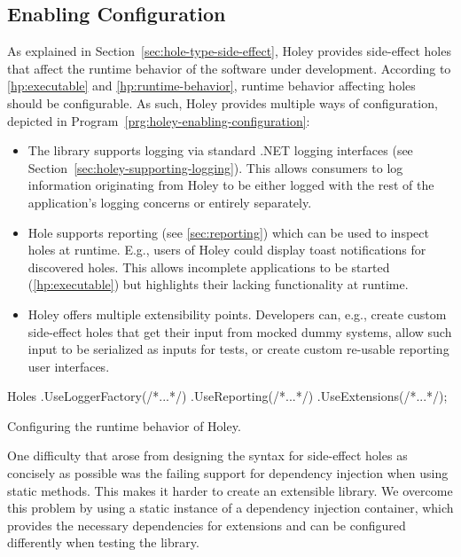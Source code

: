 \subsection{Enabling Configuration}
\label{sec:holey-enabling-configuration}
As explained in Section~\ref{sec:hole-type-side-effect}, Holey provides side-effect holes that affect the runtime behavior of the software under development.
According to \ref{hp:executable} and \ref{hp:runtime-behavior}, runtime behavior affecting holes should be configurable.
As such, Holey provides multiple ways of configuration, depicted in Program~\ref{prg:holey-enabling-configuration}:
\begin{itemize}
    \item The library supports logging via standard .NET logging interfaces (see Section~\ref{sec:holey-supporting-logging}). This allows consumers to log information originating from Holey to be either logged with the rest of the application's logging concerns or entirely separately.
    \item Hole supports reporting (see \ref{sec:reporting}) which can be used to inspect holes at runtime. E.g., users of Holey could display toast notifications for discovered holes. This allows incomplete applications to be started (\ref{hp:executable}) but highlights their lacking functionality at runtime.
    \item Holey offers multiple extensibility points. Developers can, e.g., create custom side-effect holes that get their input from mocked dummy systems, allow such input to be serialized as inputs for tests, or create custom re-usable reporting user interfaces.
\end{itemize}

\begin{program}[ht]
\begin{CsCode}
Holes
	.UseLoggerFactory(/*...*/)
	.UseReporting(/*...*/)
	.UseExtensions(/*...*/);
\end{CsCode}
\caption{Configuring the runtime behavior of Holey.}
\label{prg:holey-enabling-configuration}
\end{program}

One difficulty that arose from designing the syntax for side-effect holes as concisely as possible was the failing support for dependency injection when using static methods.
This makes it harder to create an extensible library.
We overcome this problem by using a static instance of a dependency injection container, which provides the necessary dependencies for extensions and can be configured differently when testing the library.


